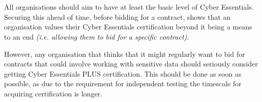 \documentclass[12pt]{article}
\begin{document}
\section*{}
All organisations should aim to have at least the basic level of Cyber Essentials. Securing this ahead of time, before bidding for a contract, shows that an organisation values their Cyber Essentials certification beyond it being a means to an end \textit{(i.e. allowing them to bid for a specific contract)}.

However, any organisation that thinks that it might regularly want to bid for contracts that could involve working with sensitive data should seriously consider getting Cyber Essentials PLUS certification. This should be done as soon as possible, as due to the requirement for independent testing the timescale for acquiring certification is longer.
\end{document}
